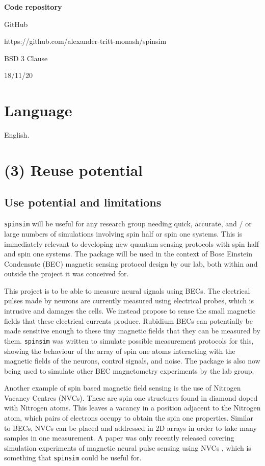 \documentclass{jors}
\begin{document}
{\bf Code repository}

\begin{description}[noitemsep,topsep=0pt]
	\item[Name:] GitHub
	\item[Persistent identifier:] https://github.com/alexander-tritt-monash/spinsim
	\item[Licence:] BSD 3 Clause
	\item[Date published:] 18/11/20
\end{description}

\section*{Language}

English.

\section*{(3) Reuse potential}

	\subsection*{Use potential and limitations}
		\texttt{spinsim} will be useful for any research group needing quick, accurate, and / or large numbers of simulations involving spin half or spin one systems. This is immediately relevant to developing new quantum sensing protocols with spin half and spin one systems. The package will be used in the context of Bose Einstein Condensate (BEC) magnetic sensing protocol design by our lab, both within and outside the project it was conceived for.

		This project is to be able to measure neural signals using BECs. The electrical pulses made by neurons are currently measured using electrical probes, which is intrusive and damages the cells. We instead propose to sense the small magnetic fields that these electrical currents produce. Rubidium BECs can potentially be made sensitive enough to these tiny magnetic fields that they can be measured by them. \texttt{spinsim} was written to simulate possible measurement protocols for this, showing the behaviour of the array of spin one atoms interacting with the magnetic fields of the neurons, control signals, and noise. The package is also now being used to simulate other BEC magnetometry experiments by the lab group.

		Another example of spin based magnetic field sensing is the use of Nitrogen Vacancy Centres (NVCs). These are spin one structures found in diamond doped with Nitrogen atoms. This leaves a vacancy in a position adjacent to the Nitrogen atom, which pairs of electrons occupy to obtain the spin one properties. Similar to BECs, NVCs can be placed and addressed in 2D arrays in order to take many samples in one measurement. A paper was only recently released covering simulation experiments of magnetic neural pulse sensing using NVCs \cite{parashar_axon_2020}, which is something that \texttt{spinsim} could be useful for.
\end{document}

